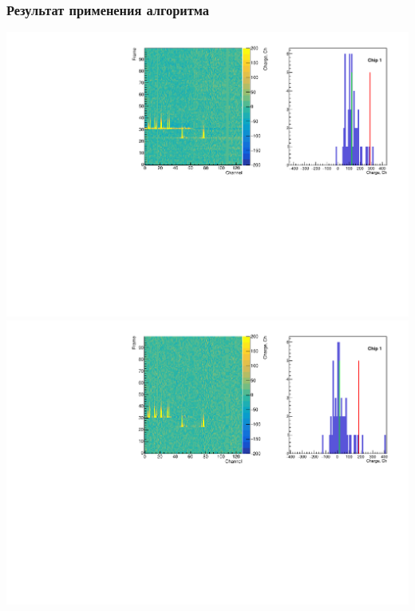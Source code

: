 \documentclass[14pt]{beamer}
\begin{document}
\begin{frame}[t]
\frametitle{Результат применения алгоритма}
\vspace{0pt}
		\centering \includegraphics[height=0.4\textheight, width=0.7\linewidth]{median_hist_unbiased.pdf}
		\includegraphics[height=0.4\textheight,width=0.7\linewidth]{median_hist_biased.pdf}
\end{frame}
\end{document}
